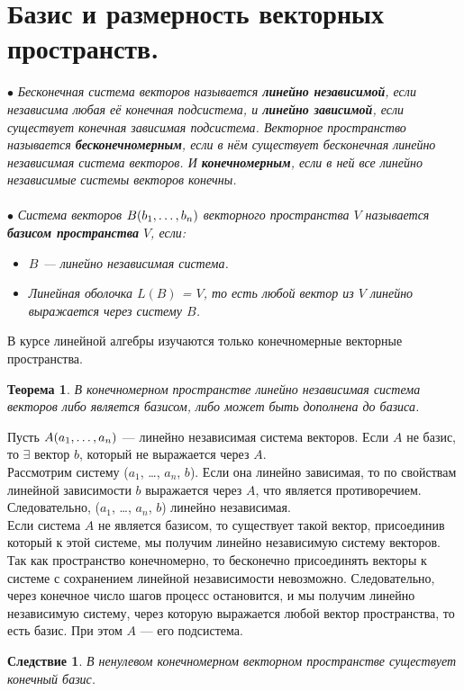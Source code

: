 \section{Базис и размерность векторных пространств.}
$\bullet$ \textit{Бесконечная система векторов называется \textbf{линейно независимой}, если независима любая её конечная подсистема, и \textbf{линейно зависимой}, если существует конечная зависимая подсистема. Векторное пространство называется \textbf{бесконечномерным}, если в нём существует бесконечная линейно независимая система векторов. И \textbf{конечномерным}, если в ней все линейно независимые системы векторов конечны.}\\\\
$\bullet$ \textit{Система векторов $B(b_1,\dots,b_n)$ векторного пространства $V$ называется \textbf{базисом пространства} $V$, если:}
\begin{itemize}
	\item \textit{$B$ --- линейно независимая система.}
	\item \textit{Линейная оболочка $L(B)$ = $V$, то есть любой вектор из $V$ линейно выражается через систему $B$.}
\end{itemize}
В курсе линейной алгебры изучаются только конечномерные векторные пространства.
\newtheorem*{Th3*}{Теорема} \begin{Th3*} В конечномерном пространстве линейно независимая система векторов либо является базисом, либо может быть дополнена до базиса. \end{Th3*}
\begin{Proof}
	Пусть $A(a_1,\dots,a_n)$ --- линейно независимая система векторов. Если $A$ не базис, то $\exists$ вектор $b$, который не выражается через $A$.\\
	Рассмотрим систему ($a_1$, \dots, $a_n$, $b$). Если она линейно зависимая, то по свойствам линейной зависимости $b$ выражается через $A$, что является противоречием. Следовательно, ($a_1$, \dots, $a_n$, $b$) линейно независимая.\\ Если система $A$ не является базисом, то существует такой вектор, присоединив который к этой системе, мы получим линейно независимую систему векторов. Так как пространство конечномерно, то бесконечно присоединять векторы к системе с сохранением линейной независимости невозможно. Следовательно, через конечное число шагов процесс остановится, и мы получим линейно независимую систему, через которую выражается любой вектор пространства, то есть базис. При этом $A$ --- его подсистема.
\end{Proof}
\newtheorem*{Cor5*}{Следствие} \begin{Cor5*} В ненулевом конечномерном векторном пространстве существует конечный базис. \end{Cor5*}
